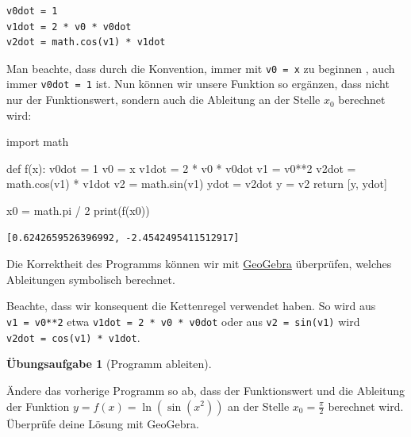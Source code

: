 \documentclass[
  a4paper,
  DIV=11]{scrreprt}
\newenvironment{Shaded}{\begin{snugshade}}{\end{snugshade}}
\newcommand{\BuiltInTok}[1]{\textcolor[rgb]{0.00,0.23,0.31}{#1}}
\newcommand{\ControlFlowTok}[1]{\textcolor[rgb]{0.00,0.23,0.31}{#1}}
\newcommand{\DecValTok}[1]{\textcolor[rgb]{0.68,0.00,0.00}{#1}}
\newcommand{\ImportTok}[1]{\textcolor[rgb]{0.00,0.46,0.62}{#1}}
\newcommand{\KeywordTok}[1]{\textcolor[rgb]{0.00,0.23,0.31}{#1}}
\newcommand{\NormalTok}[1]{\textcolor[rgb]{0.00,0.23,0.31}{#1}}
\newcommand{\OperatorTok}[1]{\textcolor[rgb]{0.37,0.37,0.37}{#1}}
\theoremstyle{definition}
\newtheorem{exercise}{Übungsaufgabe}[chapter]
\theoremstyle{definition}
\theoremstyle{remark}
\begin{document}
\begin{verbatim}
v0dot = 1
v1dot = 2 * v0 * v0dot
v2dot = math.cos(v1) * v1dot
\end{verbatim}

Man beachte, dass durch die Konvention, immer mit \texttt{v0\ =\ x} zu
beginnen , auch immer \texttt{v0dot\ =\ 1} ist. Nun können wir unsere
Funktion so ergänzen, dass nicht nur der Funktionswert, sondern auch die
Ableitung an der Stelle \(x_0\) berechnet wird:

\begin{Shaded}
\begin{Highlighting}[]
\ImportTok{import}\NormalTok{ math}

\KeywordTok{def}\NormalTok{ f(x):}
\NormalTok{    v0dot }\OperatorTok{=} \DecValTok{1}
\NormalTok{    v0 }\OperatorTok{=}\NormalTok{ x}
\NormalTok{    v1dot }\OperatorTok{=} \DecValTok{2} \OperatorTok{*}\NormalTok{ v0 }\OperatorTok{*}\NormalTok{ v0dot}
\NormalTok{    v1 }\OperatorTok{=}\NormalTok{ v0}\OperatorTok{**}\DecValTok{2}
\NormalTok{    v2dot }\OperatorTok{=}\NormalTok{ math.cos(v1) }\OperatorTok{*}\NormalTok{ v1dot}
\NormalTok{    v2 }\OperatorTok{=}\NormalTok{ math.sin(v1)}
\NormalTok{    ydot }\OperatorTok{=}\NormalTok{ v2dot}
\NormalTok{    y }\OperatorTok{=}\NormalTok{ v2}
    \ControlFlowTok{return}\NormalTok{ [y, ydot]}

\NormalTok{x0 }\OperatorTok{=}\NormalTok{ math.pi }\OperatorTok{/} \DecValTok{2}
\BuiltInTok{print}\NormalTok{(f(x0))}
\end{Highlighting}
\end{Shaded}

\begin{verbatim}
[0.6242659526396992, -2.4542495411512917]
\end{verbatim}

Die Korrektheit des Programms können wir mit
\href{https://www.geogebra.org/m/u4rkpzsr}{GeoGebra} überprüfen, welches
Ableitungen symbolisch berechnet.

Beachte, dass wir konsequent die Kettenregel verwendet haben. So wird
aus \texttt{v1\ =\ v0**2} etwa \texttt{v1dot\ =\ 2\ *\ v0\ *\ v0dot}
oder aus \texttt{v2\ =\ sin(v1)} wird
\texttt{v2dot\ =\ cos(v1)\ *\ v1dot}.

\begin{exercise}[Programm
ableiten]\protect\hypertarget{exr-ErstesADBspErweitern}{}\label{exr-ErstesADBspErweitern}

Ändere das vorherige Programm so ab, dass der Funktionswert und die
Ableitung der Funktion \(y = f(x) = \ln(\sin(x^2))\) an der Stelle
\(x_0 = \frac{\pi}{2}\) berechnet wird. Überprüfe deine Lösung mit
GeoGebra.

\end{exercise}
\end{document}
